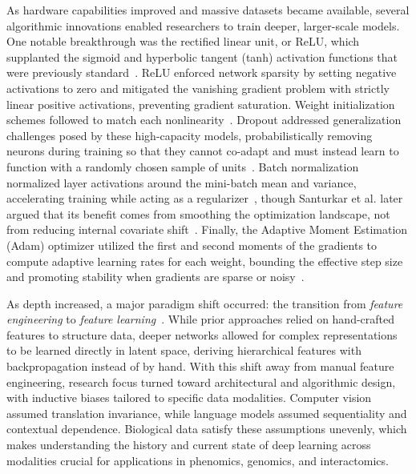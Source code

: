 As hardware capabilities improved and massive datasets became available, several algorithmic innovations enabled researchers to train deeper, larger-scale models. One notable breakthrough was the rectified linear unit, or ReLU, which supplanted the sigmoid and hyperbolic tangent (tanh) activation functions that were previously standard~\cite{glorot2011deep}. ReLU enforced network sparsity by setting negative activations to zero and mitigated the vanishing gradient problem with strictly linear positive activations, preventing gradient saturation. Weight initialization schemes followed to match each nonlinearity~\cite{glorot2010understanding, he2015delving}. Dropout addressed generalization challenges posed by these high-capacity models, probabilistically removing neurons during training so that they cannot co-adapt and must instead learn to function with a randomly chosen sample of units~\cite{srivastava2014dropout}. Batch normalization normalized layer activations around the mini-batch mean and variance, accelerating training while acting as a regularizer~\cite{ioffe2015batch}, though Santurkar et al. later argued that its benefit comes from smoothing the optimization landscape, not from reducing internal covariate shift~\cite{santurkar2018does}. Finally, the Adaptive Moment Estimation (Adam) optimizer utilized the first and second moments of the gradients to compute adaptive learning rates for each weight, bounding the effective step size and promoting stability when gradients are sparse or noisy~\cite{kingma2014adam}.

As depth increased, a major paradigm shift occurred: the transition from \textit{feature engineering} to \textit{feature learning}~\cite{lecun2015deep}. While prior approaches relied on hand-crafted features to structure data, deeper networks allowed for complex representations to be learned directly in latent space, deriving hierarchical features with backpropagation instead of by hand. With this shift away from manual feature engineering, research focus turned toward architectural and algorithmic design, with inductive biases tailored to specific data modalities. Computer vision assumed translation invariance, while language models assumed sequentiality and contextual dependence. Biological data satisfy these assumptions unevenly, which makes understanding the history and current state of deep learning across modalities crucial for applications in phenomics, genomics, and interactomics.

